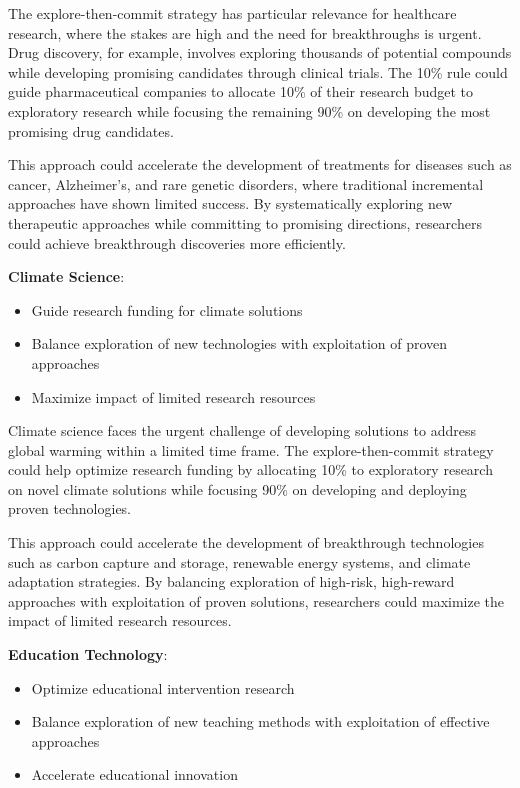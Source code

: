 \documentclass[letterpaper]{article} %
\begin{document}
The explore-then-commit strategy has particular relevance for healthcare research, where the stakes are high and the need for breakthroughs is urgent. Drug discovery, for example, involves exploring thousands of potential compounds while developing promising candidates through clinical trials. The 10\% rule could guide pharmaceutical companies to allocate 10\% of their research budget to exploratory research while focusing the remaining 90\% on developing the most promising drug candidates.

This approach could accelerate the development of treatments for diseases such as cancer, Alzheimer's, and rare genetic disorders, where traditional incremental approaches have shown limited success. By systematically exploring new therapeutic approaches while committing to promising directions, researchers could achieve breakthrough discoveries more efficiently.

\textbf{Climate Science}:
\begin{itemize}
\item Guide research funding for climate solutions
\item Balance exploration of new technologies with exploitation of proven approaches
\item Maximize impact of limited research resources
\end{itemize}

Climate science faces the urgent challenge of developing solutions to address global warming within a limited time frame. The explore-then-commit strategy could help optimize research funding by allocating 10\% to exploratory research on novel climate solutions while focusing 90\% on developing and deploying proven technologies.

This approach could accelerate the development of breakthrough technologies such as carbon capture and storage, renewable energy systems, and climate adaptation strategies. By balancing exploration of high-risk, high-reward approaches with exploitation of proven solutions, researchers could maximize the impact of limited research resources.

\textbf{Education Technology}:
\begin{itemize}
\item Optimize educational intervention research
\item Balance exploration of new teaching methods with exploitation of effective approaches
\item Accelerate educational innovation
\end{itemize}
\end{document}
